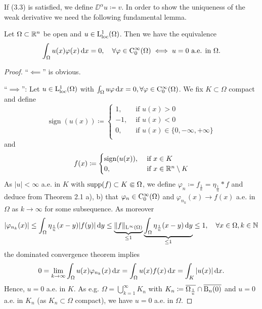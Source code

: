 If (3.3) is satisfied, we define $\DD^\alpha u \coloneqq v$.
In order to show the uniqueness of the weak derivative we need the following fundamental lemma.

\begin{lem}
  Let $\Omega \subset \mathbb{R}^n$ be open and $u \in \mathrm{L}_{\operatorname{loc}}^1(\Omega)$.
  Then we have the equivalence
  $$
  \int_\Omega u(x) \varphi(x) \, {\operatorname{d}\!{x}} = 0, \quad \forall \varphi \in \mathrm{C}_0^\infty(\Omega) \iff u = 0 \text{ a.e. in } \Omega.
  $$
\end{lem}

\begin{proof}
  ``$\impliedby$'' is obvious.

``$\implies$'': Let $u \in \mathrm{L}^1_{\operatorname{loc}}(\Omega)$ with $\int_\Omega u\varphi \, {\operatorname{d}\!{x}} = 0, \forall \varphi \in \mathrm{C}_0^\infty(\Omega)$.
We fix $K \subset \Omega$ compact and define
$$
\operatorname{sign}(u(x)) \coloneqq 
\begin{cases} 
  1, &\text{ if } u(x) > 0 \\
  -1, &\text{ if } u(x) <  0 \\
  0, &\text{ if } u(x) \in \{ 0, -\infty, +\infty\} \\
\end{cases}
$$
and
$$
f(x) \coloneqq \begin{cases} \operatorname{sign}(u(x)), &\text{ if } x \in K \\ 0,  &\text{ if } x \in \mathbb{R}^n \setminus K \end{cases}
$$
As $|u| < \infty$ a.e. in $K$ with $\operatorname{supp}(f) \subset K \Subset \Omega$, we define $\varphi_n \coloneqq f_{\frac{1}{n}} = \eta_{\frac{1}{n}} \ast f$ and deduce from Theorem 2.1 a), b) that $\varphi_n \in \mathrm{C}_0^\infty(\Omega)$ and $\varphi_{n_k}(x) \to f(x)$ a.e. in $\Omega$ as $k \to \infty$ for some subsequence.
As moreover
$$
|\varphi_{n_k}(x)| 
\leq \int_\Omega \eta_{\frac{1}{n}}(x - y) |f(y)| \, {\operatorname{d}\!{y}}
\leq \underbrace{\|f\|_{\mathrm{L}^\infty(\Omega)}}_{\leq 1} \underbrace{ \int_\Omega \eta_{\frac{1}{n}} (x - y) \, {\operatorname{d}\!{y}}}_{\leq 1}
\leq 1, \quad \forall x \in \Omega, k \in \mathbb{N}
$$
the dominated convergence theorem implies
$$
0 = \lim_{k \to \infty} \int_\Omega u(x) \varphi_{n_k}(x) \, {\operatorname{d}\!{x}} 
= \int_\Omega u(x) f(x) \, {\operatorname{d}\!{x}} = \int_K |u(x)| \, {\operatorname{d}\!{x}}.
$$
Hence, $u = 0$ a.e. in $K$.
As e.g. $\Omega = \bigcup_{k = 1}^\infty K_n$ with $K_n \coloneqq \overline{\Omega_{\frac{1}{n}}} \cap \overline{\mathrm{B}_n(0)}$ and $u = 0$ a.e. in $K_n$ (as $K_n \subset \Omega$ compact), we have $u = 0$ a.e. in $\Omega$.
\end{proof}

